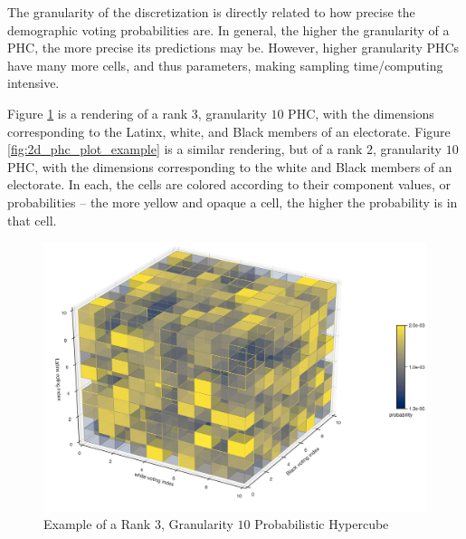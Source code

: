 The granularity of the discretization is directly related to how precise the demographic voting probabilities are. In general, the higher the granularity of a PHC, the more precise its predictions may be. However, higher granularity PHCs have many more cells, and thus parameters, making sampling time/computing intensive.

Figure \ref{fig:3d_phc_plot_example} is a rendering of a rank $3$, granularity $10$ PHC, with the dimensions corresponding to the Latinx, white, and Black members of an electorate. Figure \ref{fig:2d_phc_plot_example} is a similar rendering, but of a rank $2$, granularity $10$ PHC, with the dimensions corresponding to the white and Black members of an electorate. In each, the cells are colored according to their component values, or probabilities -- the more yellow and opaque a cell, the higher the probability is in that cell.

\begin{figure}[ht]\centering
 \includegraphics[width=\linewidth]{figures/3d_phc_plot_example.png}
 \caption{Example of a Rank $3$, Granularity $10$ Probabilistic Hypercube}
 \label{fig:3d_phc_plot_example}
\end{figure}

